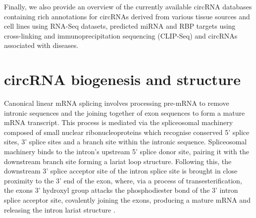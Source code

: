 \documentclass[pdflatex,sn-mathphys-num]{sn-jnl}
\begin{document}
Finally, we also provide an overview of the currently available circRNA databases containing rich annotations for circRNAs derived from various tissue sources and cell lines using RNA-Seq datasets, predicted miRNA and RBP targets using cross-linking and immunoprecipitation sequencing (CLIP-Seq) and circRNAs associated with diseases. 

\section{circRNA biogenesis and structure}
Canonical linear mRNA splicing involves processing pre-mRNA to remove intronic sequences and the joining together of exon sequences to form a mature mRNA transcript. This process is mediated via the spliceosomal machinery composed of small nuclear ribonucleoproteins which recognise conserved 5' splice sites,  3' splice sites and a branch site within the intronic sequence. Spliceosomal machinery binds to the intron's upstream 5' splice donor site, pairing it with the downstream branch site forming a lariat loop structure. Following this, the downstream 3' splice acceptor site of the intron splice site is brought in close proximity to the 3' end of the exon, where, via a process of transesterification, the exons 3' hydroxyl group attacks the phosphodiester bond of the 3' intron splice acceptor site, covalently joining the exons, producing a mature mRNA and releasing the intron lariat structure \cite{BibEntry2019Dec}. \par
\end{document}
